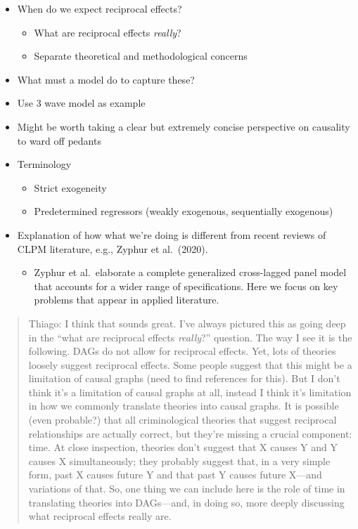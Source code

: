 \documentclass[
  letterpaper,
  DIV=11,
  numbers=noendperiod]{scrartcl}
\providecommand{\tightlist}{%
  \setlength{\itemsep}{0pt}\setlength{\parskip}{0pt}}\usepackage{longtable,booktabs,array}
\begin{document}
\begin{itemize}
\tightlist
\item
  When do we expect reciprocal effects?

  \begin{itemize}
  \tightlist
  \item
    What are reciprocal effects \emph{really}?
  \item
    Separate theoretical and methodological concerns
  \end{itemize}
\item
  What must a model do to capture these?
\item
  Use 3 wave model as example
\item
  Might be worth taking a clear but extremely concise perspective on
  causality to ward off pedants
\item
  Terminology

  \begin{itemize}
  \tightlist
  \item
    Strict exogeneity
  \item
    Predetermined regressors (weakly exogenous, sequentially exogenous)
  \end{itemize}
\item
  Explanation of how what we're doing is different from recent reviews
  of CLPM literature, e.g., Zyphur et al.~(2020).

  \begin{itemize}
  \tightlist
  \item
    Zyphur et al.~elaborate a complete generalized cross-lagged panel
    model that accounts for a wider range of specifications. Here we
    focus on key problems that appear in applied literature.
  \end{itemize}
\end{itemize}

\begin{quote}
Thiago: I think that sounds great. I've always pictured this as going
deep in the ``what are reciprocal effects \emph{really}?'' question. The
way I see it is the following. DAGs do not allow for reciprocal effects.
Yet, lots of theories loosely suggest reciprocal effects. Some people
suggest that this might be a limitation of causal graphs (need to find
references for this). But I don't think it's a limitation of causal
graphs at all, instead I think it's limitation in how we commonly
translate theories into causal graphs. It is possible (even probable?)
that all criminological theories that suggest reciprocal relationships
are actually correct, but they're missing a crucial component: time. At
close inspection, theories don't suggest that X causes Y and Y causes X
simultaneously; they probably suggest that, in a very simple form, past
X causes future Y and that past Y causes future X---and variations of
that. So, one thing we can include here is the role of time in
translating theories into DAGs---and, in doing so, more deeply
discussing what reciprocal effects really are.
\end{quote}
\end{document}
